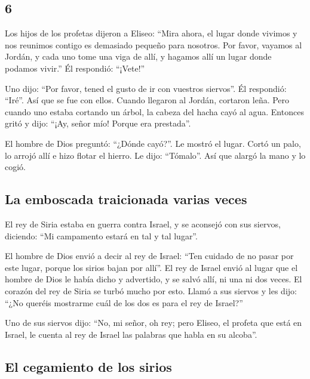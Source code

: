 \begin{paracol}{2}
{\section{6}\label{section-10}}

 Los hijos de los profetas dijeron a Eliseo: ``Mira ahora,
el lugar donde vivimos y nos reunimos contigo es demasiado pequeño para
nosotros.  Por favor, vayamos al Jordán, y cada uno tome
una viga de allí, y hagamos allí un lugar donde podamos vivir.'' Él
respondió: ``¡Vete!''

 Uno dijo: ``Por favor, tened el gusto de ir con vuestros
siervos''. Él respondió: ``Iré''.  Así que se fue con
ellos. Cuando llegaron al Jordán, cortaron leña.  Pero
cuando uno estaba cortando un árbol, la cabeza del hacha cayó al agua.
Entonces gritó y dijo: ``¡Ay, señor mío! Porque era prestada''.

 El hombre de Dios preguntó: ``¿Dónde cayó?''. Le mostró
el lugar. Cortó un palo, lo arrojó allí e hizo flotar el hierro.
 Le dijo: ``Tómalo''. Así que alargó la mano y lo cogió.

\hypertarget{la-emboscada-traicionada-varias-veces}{%
\subsection{La emboscada traicionada varias
veces}\label{la-emboscada-traicionada-varias-veces}}

 El rey de Siria estaba en guerra contra Israel, y se
aconsejó con sus siervos, diciendo: ``Mi campamento estará en tal y tal
lugar''.

 El hombre de Dios envió a decir al rey de Israel: ``Ten
cuidado de no pasar por este lugar, porque los sirios bajan por allí''.
 El rey de Israel envió al lugar que el hombre de Dios le
había dicho y advertido, y se salvó allí, ni una ni dos veces.
 El corazón del rey de Siria se turbó mucho por esto.
Llamó a sus siervos y les dijo: ``¿No queréis mostrarme cuál de los dos
es para el rey de Israel?''

 Uno de sus siervos dijo: ``No, mi señor, oh rey; pero
Eliseo, el profeta que está en Israel, le cuenta al rey de Israel las
palabras que habla en su alcoba''.

\hypertarget{el-cegamiento-de-los-sirios}{%
\subsection{El cegamiento de los
sirios}\label{el-cegamiento-de-los-sirios}}


\end{paracol}
